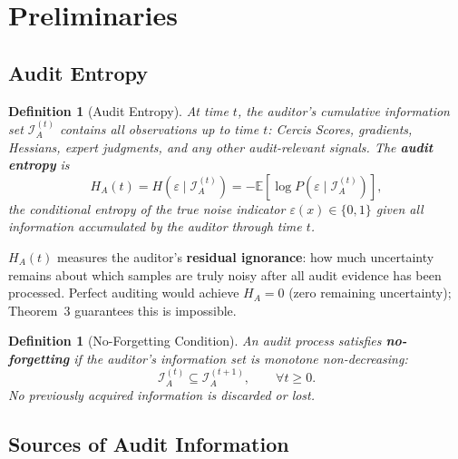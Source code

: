 \documentclass[12pt,a4paper]{article}
\newtheorem{definition}[theorem]{Definition}
\newcommand{\E}{\mathbb{E}}
\newcommand{\cI}{\mathcal{I}}
\begin{document}
\section{Preliminaries}

\subsection{Audit Entropy}

\begin{definition}[Audit Entropy]
\label{def:audit-entropy}
At time $t$, the auditor's cumulative information set $\cI_A^{(t)}$ contains
all observations up to time $t$: Cercis Scores, gradients, Hessians, expert
judgments, and any other audit-relevant signals.  The \textbf{audit entropy} is
\begin{equation}\label{eq:H-A-def}
    H_A(t) = H(\varepsilon \mid \cI_A^{(t)})
    = -\E\left[\log P(\varepsilon \mid \cI_A^{(t)})\right],
\end{equation}
the conditional entropy of the true noise indicator $\varepsilon(x)\in\{0,1\}$
given all information accumulated by the auditor through time $t$.
\end{definition}

$H_A(t)$ measures the auditor's \textbf{residual ignorance}: how much
uncertainty remains about which samples are truly noisy after all audit
evidence has been processed.  Perfect auditing would achieve $H_A=0$ (zero
remaining uncertainty); Theorem~3 guarantees this is impossible.

\begin{definition}[No-Forgetting Condition]
\label{def:no-forgetting}
An audit process satisfies \textbf{no-forgetting} if the auditor's information
set is monotone non-decreasing:
\begin{equation}\label{eq:no-forgetting}
    \cI_A^{(t)} \subseteq \cI_A^{(t+1)}, \qquad \forall t\geq0.
\end{equation}
No previously acquired information is discarded or lost.
\end{definition}

\subsection{Sources of Audit Information}
\end{document}
